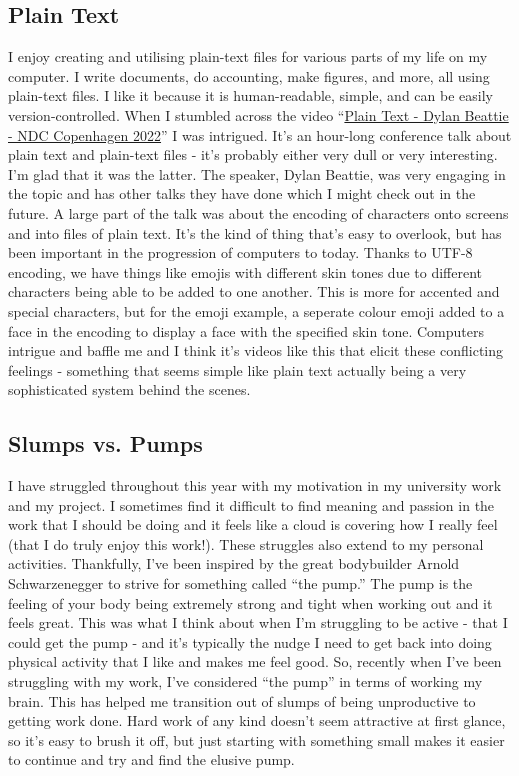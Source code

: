\documentclass[11pt]{article}
\begin{document}
\subsection{Plain Text}

I enjoy creating and utilising plain-text files for various parts of my life on my computer. I write documents, do accounting, make figures, and more, all using plain-text files. I like it because it is human-readable, simple, and can be easily version-controlled. When I stumbled across the video ``\href{https://www.youtube.com/watch?v=gd5uJ7Nlvvo}{Plain Text - Dylan Beattie - NDC Copenhagen 2022}'' I was intrigued. It's an hour-long conference talk about plain text and plain-text files - it's probably either very dull or very interesting. I'm glad that it was the latter. The speaker, Dylan Beattie, was very engaging in the topic and has other talks they have done which I might check out in the future. A large part of the talk was about the encoding of characters onto screens and into files of plain text. It's the kind of thing that's easy to overlook, but has been important in the progression of computers to today. Thanks to UTF-8 encoding, we have things like emojis with different skin tones due to different characters being able to be added to one another. This is more for accented and special characters, but for the emoji example, a seperate colour emoji added to a face in the encoding to display a face with the specified skin tone. Computers intrigue and baffle me and I think it's videos like this that elicit these conflicting feelings - something that seems simple like plain text actually being a very sophisticated system behind the scenes.

\subsection{Slumps vs. Pumps}

I have struggled throughout this year with my motivation in my university work and my project. I sometimes find it difficult to find meaning and passion in the work that I should be doing and it feels like a cloud is covering how I really feel (that I do truly enjoy this work!). These struggles also extend to my personal activities. Thankfully, I've been inspired by the great bodybuilder Arnold Schwarzenegger to strive for something called ``the pump.'' The pump is the feeling of your body being extremely strong and tight when working out and it feels great. This was what I think about when I'm struggling to be active - that I could get the pump - and it's typically the nudge I need to get back into doing physical activity that I like and makes me feel good. So, recently when I've been struggling with my work, I've considered ``the pump'' in terms of working my brain. This has helped me transition out of slumps of being unproductive to getting work done. Hard work of any kind doesn't seem attractive at first glance, so it's easy to brush it off, but just starting with something small makes it easier to continue and try and find the elusive pump.
\end{document}
